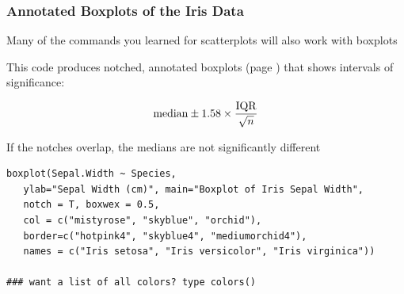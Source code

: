 \documentclass[10pt]{beamer}
\begin{document}
\begin{frame}
\begin{center}
\end{center}
\end{frame}




\begin{frame}[fragile]
\frametitle{Annotated Boxplots of the Iris Data}

\bi

\item Many of the commands you learned for scatterplots will also work
  with boxplots

\item This code produces notched, annotated boxplots (page
  \pageref{notchedboxplot}) that shows intervals of significance:

\[
{\rm median} \pm 1.58 \times \frac{\rm IQR}{\sqrt{n}}
\]


If the notches overlap, the medians are not significantly different

{\scriptsize
\color{red}
\begin{verbatim}
boxplot(Sepal.Width ~ Species, 
   ylab="Sepal Width (cm)", main="Boxplot of Iris Sepal Width",
   notch = T, boxwex = 0.5,
   col = c("mistyrose", "skyblue", "orchid"),
   border=c("hotpink4", "skyblue4", "mediumorchid4"),
   names = c("Iris setosa", "Iris versicolor", "Iris virginica"))

### want a list of all colors? type colors()
\end{verbatim}
}

\ei

\end{frame}
\end{document}
